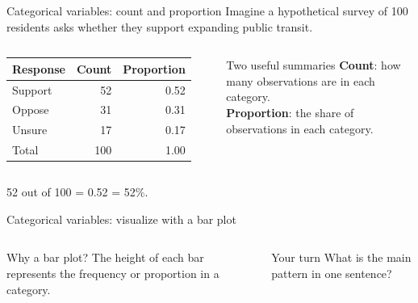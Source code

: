 \documentclass[11pt,aspectratio=169]{beamer}
\begin{document}
\begin{frame}{Categorical variables: count and proportion}
\small
Imagine a hypothetical survey of 100 residents asks whether they support expanding public transit.

\vspace{0.5em}
\begin{columns}[T,onlytextwidth]
\begin{tabular}{lrr}
\toprule
Response & Count & Proportion \\
\midrule
Support & 52 & 0.52 \\
Oppose & 31 & 0.31 \\
Unsure & 17 & 0.17 \\
\midrule
Total & 100 & 1.00 \\
\bottomrule
\end{tabular}
\begin{block}{Two useful summaries}
\textbf{Count}: how many observations are in each category.\\[0.6em]
\textbf{Proportion}: the share of observations in each category.
\end{block}
\end{columns}
\vfill \pause
\alert{52 out of 100 = 0.52 = 52\%.}
\end{frame}

\begin{frame}{Categorical variables: visualize with a bar plot}
\begin{columns}[c,onlytextwidth]
\centering
{}
\begin{block}{Why a bar plot?}
The height of each bar represents the frequency or proportion in a category.
\end{block}
\vspace{0.5em}
\begin{alertblock}{Your turn}
What is the main pattern in one sentence?
\end{alertblock}
\end{columns}
\end{frame}
\end{document}
